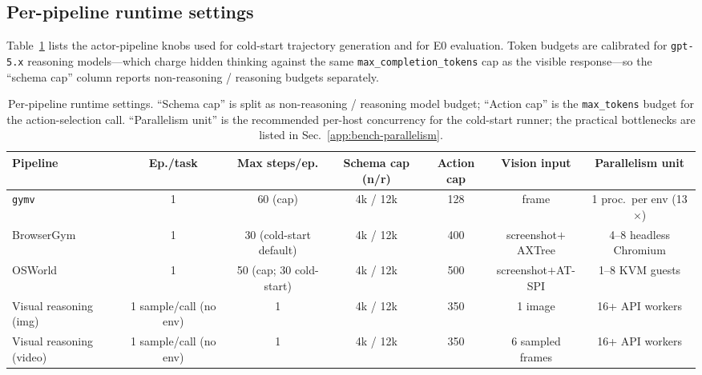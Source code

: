 \subsection{Per-pipeline runtime settings}
\label{app:bench-runtime}

Table~\ref{tab:bench-runtime} lists the actor-pipeline knobs used for
cold-start trajectory generation and for E0 evaluation. Token budgets
are calibrated for \texttt{gpt-5.x} reasoning models---which charge
hidden thinking against the same \texttt{max\_completion\_tokens} cap
as the visible response---so the ``schema cap'' column reports
non-reasoning / reasoning budgets separately.

\begin{table}[t]
\centering
\small
\caption{Per-pipeline runtime settings. ``Schema cap'' is split as
non-reasoning / reasoning model budget; ``Action cap'' is the
\texttt{max\_tokens} budget for the action-selection call. ``Parallelism
unit'' is the recommended per-host concurrency for the cold-start
runner; the practical bottlenecks are listed in
Sec.~\ref{app:bench-parallelism}.}
\label{tab:bench-runtime}
\renewcommand{\arraystretch}{1.10}
\begin{tabular}{@{}lcccccc@{}}
\toprule
\textbf{Pipeline} & \textbf{Ep./task} & \textbf{Max steps/ep.} & \textbf{Schema cap (n/r)} & \textbf{Action cap} & \textbf{Vision input} & \textbf{Parallelism unit} \\
\midrule
\texttt{gymv}             & 1                       & 60 (cap)                          & 4k / 12k & 128 & frame              & 1 proc.\ per env (13$\times$) \\
BrowserGym                & 1                       & 30 (cold-start default)           & 4k / 12k & 400 & screenshot$+$AXTree & 4--8 headless Chromium \\
OSWorld                   & 1                       & 50 (cap; 30 cold-start)           & 4k / 12k & 500 & screenshot$+$AT-SPI & 1--8 KVM guests \\
Visual reasoning (img)    & 1 sample/call (no env)  & 1                                 & 4k / 12k & 350 & 1 image            & 16+ API workers \\
Visual reasoning (video)  & 1 sample/call (no env)  & 1                                 & 4k / 12k & 350 & 6 sampled frames   & 16+ API workers \\
\bottomrule
\end{tabular}
\end{table}

